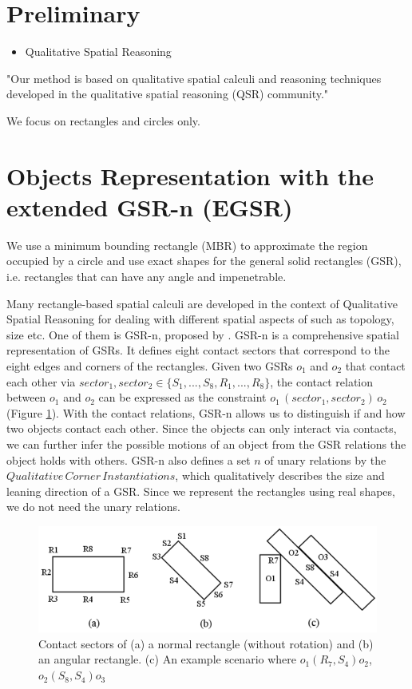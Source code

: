 \documentclass[letterpaper]{article}
\begin{document}
\section{Preliminary}
\begin{itemize}
\item Qualitative Spatial Reasoning
\end{itemize}
 
"Our method is based on qualitative spatial calculi and reasoning techniques developed in the qualitative spatial reasoning (QSR) community."

We focus on rectangles and circles only.
\section{Objects Representation with the extended GSR-n (EGSR)} 

We use a minimum bounding rectangle (MBR) to approximate the region occupied by a circle and use exact shapes for the general solid rectangles (GSR), i.e. rectangles that can have any angle and impenetrable. 

Many rectangle-based spatial calculi \cite{balbiani1998model,cohn2012thinking,sokeh2013efficient} are developed in the context of Qualitative Spatial Reasoning \cite{cohn2001qualitative} for dealing with different spatial aspects of such as topology, size etc. One of them is GSR-n, proposed by \cite{Ge2013}. GSR-n is a comprehensive spatial representation of GSRs. It defines eight contact sectors that correspond to the eight edges and corners of the rectangles. Given two GSRs $o_1$ and $o_2$ that contact each other via $sector_1, sector_2 \in \{S_1, ..., S_8, R_1, ..., R_8\}$, the contact relation between $o_1$ and $o_2$ can be expressed as the constraint $o_1 \, (sector_1, sector_2) \, o_2$ (Figure \ref{GSR}). With the contact relations, GSR-n allows us to distinguish if and how two objects contact each other. Since the objects can only interact via contacts, we can further infer the possible motions of an object from the GSR relations the object holds with others. GSR-n also defines a set $n$ of unary relations by the $Qualitative\,Corner\,Instantiations$, which qualitatively describes the size and leaning direction of a GSR. Since we represent the rectangles using real shapes, we do not need the unary relations. 
\begin{figure}[h!]
\centering\includegraphics[scale=0.25]{GSR.png}\caption{Contact sectors of (a) a normal rectangle (without rotation) and (b) an angular rectangle. (c) An example scenario where $o_1 (R_7, S_4) o_2$, $o_2 (S_8, S_4) o_3$}
\label{GSR}
\end{figure}
\end{document}
